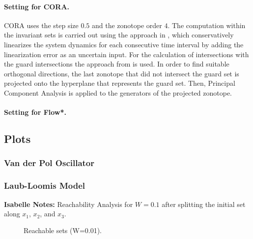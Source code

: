 \documentclass[EPiC]{easychair}
\begin{document}
\paragraph{Setting for CORA.}

CORA uses the step size $0.5$ and the zonotope order $4$. The computation within the invariant sets is carried out using the approach in \cite{Althoff2008c}, which conservatively linearizes the system dynamics for each consecutive time interval by adding the linearization error as an uncertain input. For the calculation of intersections with the guard intersections the approach from \cite{Girard2008} is used. In order to find suitable orthogonal directions, the last zonotope that did not intersect the guard set is projected onto the hyperplane that represents the guard set. Then, Principal Component Analysis is applied to the generators of the projected zonotope.

\paragraph{Setting for Flow*.}





\subsection{Plots}

\subsubsection{Van der Pol Oscillator}

\subsubsection{Laub-Loomis Model}

\textbf{Isabelle Notes:} Reachability Analysis for $W = 0.1$ after splitting the initial set along $x_1$, $x_2$, and $x_3$.

\begin{figure}[ht!b]
\centering
{}
  \hspace{0.2in}
\caption{Reachable sets (W=0.01).}
\label{fig:laubloomis}
\end{figure}
\end{document}
